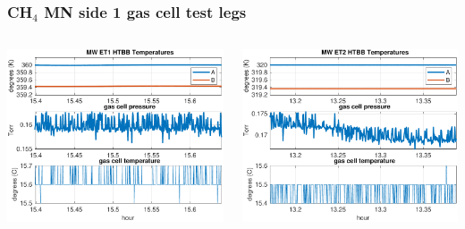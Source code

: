 \documentclass[9pt]{beamer}
\begin{document}
\begin{frame}
\frametitle{CH$_4$ MN side 1 gas cell test legs}

\begin{columns}[t]
\begin{column}{0.45\textwidth}
  \begin{centering}
  \includegraphics[width=\textwidth]{harvest_02-11/02-11_MW_ET1.pdf}
  \end{centering}
\end{column}
\begin{column}{0.45\textwidth}  
  \begin{centering}
  \includegraphics[width=\textwidth]{harvest_02-11/02-11_MW_ET2.pdf}
  \end{centering}
\end{column}
\end{columns}
\vspace{3mm}


\end{frame}
\end{document}
